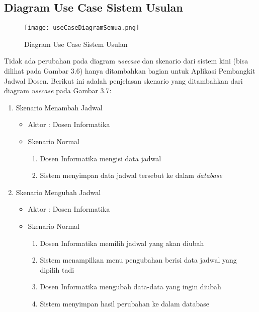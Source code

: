 \subsection{Diagram Use Case Sistem Usulan}
\begin{figure} [H]
	\centering  
	\texttt{[image: useCaseDiagramSemua.png]}
	\caption[Diagram Use Case Sistem Usulan]{Diagram Use Case Sistem Usulan} 
	\label{fig:flow-chart-CodeIgniter} 
\end{figure}

Tidak ada perubahan pada diagram \textit{usecase} dan skenario dari sistem kini (bisa dilihat pada Gambar 3.6) hanya ditambahkan bagian untuk Aplikasi Pembangkit Jadwal Dosen. Berikut ini adalah penjelasan skenario yang ditambahkan dari diagram \textit{usecase} pada Gambar 3.7:
\begin{enumerate}
	\item Skenario Menambah Jadwal
	\begin{itemize}
		\item Aktor : Dosen Informatika
		\item Skenario Normal
			\begin{enumerate}[1.]
				\item Dosen Informatika mengisi data jadwal
				\item Sistem menyimpan data jadwal tersebut ke dalam \textit{database}
			\end{enumerate}
	\end{itemize}

	\item Skenario Mengubah Jadwal
	\begin{itemize}
		\item Aktor : Dosen Informatika
		\item Skenario Normal
			\begin{enumerate}[1.]
				\item Dosen Informatika memilih jadwal yang akan diubah
				\item Sistem menampilkan menu pengubahan berisi data jadwal yang dipilih tadi
				\item Dosen Informatika mengubah data-data yang ingin diubah
				\item Sistem menyimpan hasil perubahan ke dalam database
			\end{enumerate}
	\end{itemize}



\end{enumerate}
